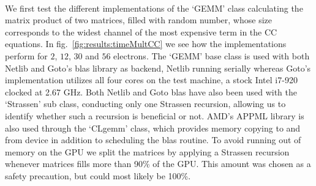 \paragraph{}
We first test the different implementations of the `GEMM' class calculating the matrix product of two matrices, filled with random number, whose size corresponds to the widest channel of the most expensive term in the CC equations. 
In fig.~\ref{fig:results:timeMultCC} we see how the implementations perform for $2$, $12$, $30$ and $56$ electrons.
The `GEMM' base class is used with both Netlib and Goto's blas library as backend, Netlib running serially whereas Goto's implementation utilizes all four cores on the test machine, a stock Intel i7-920 clocked at 2.67 GHz.
Both Netlib and Goto blas have also been used with the `Strassen' sub class, conducting only one Strassen recursion, allowing us to identify whether such a recursion is beneficial or not.
AMD's APPML library is also used through the `CLgemm' class, which provides memory copying to and from device in addition to scheduling the blas routine.
To avoid running out of memory on the GPU we split the matrices by applying a Strassen recursion whenever matrices fills more than 90\% of the GPU.
This amount was chosen as a safety precaution, but could most likely be 100\%.
